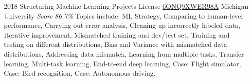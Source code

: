 \documentclass[11pt,a4paper]{moderncv}
\begin{document}
\cventry
    {2018}
    {Structuring Machine Learning Projects}
    {License
        \href{https://www.coursera.org/account/accomplishments/records/6QNQ9XWER98A}
        {6QNQ9XWER98A}
    }
    {Michigan University}
    {\textit{Score 86.7\%}}
    {
        Topics include:                                                          %
            ML Strategy,                                                          %
            Comparing to human-level performance,                                                          %
            Carrying out error analysis,                                                          %
            Cleaning up incorrectly labeled data,                                                          %
            Iterative improvement,                                                          %
            Mismatched training and dev/test set,                                                          %
            Training and testing on different distributions,                                                          %
            Bias and Variance with mismatched data distributions,                                                          %
            Addressing data mismatch,                                                          %
            Learning from multiple tasks,                                                          %
            Transfer learning,                                                          %
            Multi-task learning,                                                          %
            End-to-end deep learning,                                                          %
            Case: Flight simulator,                                                          %
            Case: Bird recognition,                                                          %
            Case: Autonomous driving.                                                          %
    }
\end{document}
